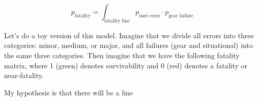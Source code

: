 \documentclass[11pt]{amsart}
\begin{document}
$$p_\text{fatality} = \int_\text{fatality line} p_\text{user error}\cdot p_\text{gear failure}$$

Let's do a toy version of this model. Imagine that we divide all errors into three categories: minor, medium, or major, and all failures (gear and situational) into the same three categories. Then imagine that we have the following fatality matrix, where 1 (green) denotes survivability and 0 (red) denotes a fatality or near-fatality. 

\begin{center}
\vrule{}\vrule

\end{center}
My hypothesis is that there will be a line 
\end{document}
